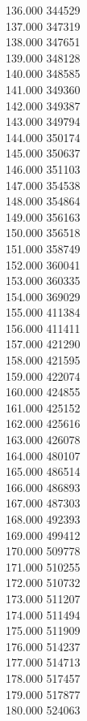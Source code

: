 { 136.000	344529 \\
 137.000	347319 \\
 138.000	347651 \\
 139.000	348128 \\
 140.000	348585 \\
 141.000	349360 \\
 142.000	349387 \\
 143.000	349794 \\
 144.000	350174 \\
 145.000	350637 \\
 146.000	351103 \\
 147.000	354538 \\
 148.000	354864 \\
 149.000	356163 \\
 150.000	356518 \\
 151.000	358749 \\
 152.000	360041 \\
 153.000	360335 \\
 154.000	369029 \\
 155.000	411384 \\
 156.000	411411 \\
 157.000	421290 \\
 158.000	421595 \\
 159.000	422074 \\
 160.000	424855 \\
 161.000	425152 \\
 162.000	425616 \\
 163.000	426078 \\
 164.000	480107 \\
 165.000	486514 \\
 166.000	486893 \\
 167.000	487303 \\
 168.000	492393 \\
 169.000	499412 \\
 170.000	509778 \\
 171.000	510255 \\
 172.000	510732 \\
 173.000	511207 \\
 174.000	511494 \\
 175.000	511909 \\
 176.000	514237 \\
 177.000	514713 \\
 178.000	517457 \\
 179.000	517877 \\
 180.000	524063 \\
}
